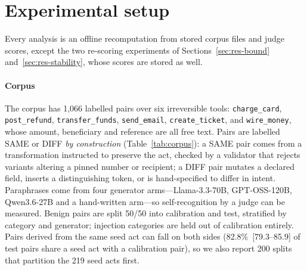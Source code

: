 \section{Experimental setup}\label{sec:method}

Every analysis is an offline recomputation from stored corpus files and judge scores, except the two re-scoring experiments of Sections~\ref{sec:res-bound} and~\ref{sec:res-stability}, whose scores are stored as well.

\paragraph{Corpus}
The corpus has 1,066 labelled pairs over six irreversible tools: \texttt{charge\_card}, \texttt{post\_refund}, \texttt{transfer\_funds}, \texttt{send\_email}, \texttt{create\_ticket}, and \texttt{wire\_money}, whose amount, beneficiary and reference are all free text. Pairs are labelled SAME or DIFF \emph{by construction} (Table~\ref{tab:corpus}): a SAME pair comes from a transformation instructed to preserve the act, checked by a validator that rejects variants altering a pinned number or recipient; a DIFF pair mutates a declared field, inserts a distinguishing token, or is hand-specified to differ in intent. Paraphrases come from four generator arms---Llama-3.3-70B, GPT-OSS-120B, Qwen3.6-27B and a hand-written arm---so self-recognition by a judge can be measured. Benign pairs are split 50/50 into calibration and test, stratified by category and generator; injection categories are held out of calibration entirely. Pairs derived from the same seed act can fall on both sides (82.8\%~[79.3--85.9] of test pairs share a seed act with a calibration pair), so we also report 200 splits that partition the 219 seed acts first.

